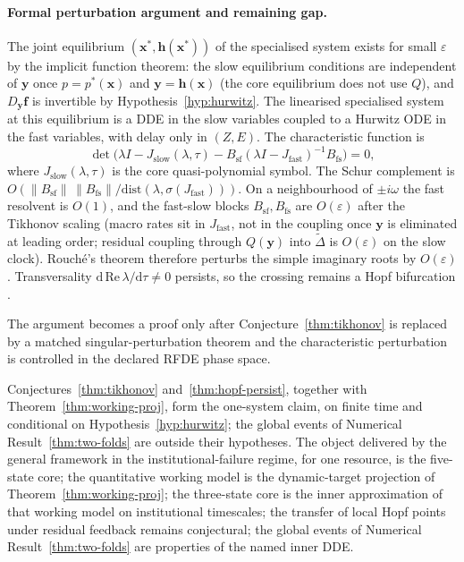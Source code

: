 \documentclass[11pt]{article}
\theoremstyle{definition}
\begin{document}
\paragraph{Formal perturbation argument and remaining gap.}
The joint equilibrium $(\mathbf x^*,\mathbf h(\mathbf x^*))$ of the specialised system exists for small $\varepsilon$ by the implicit function theorem: the slow equilibrium conditions are independent of $\mathbf y$ once $p=p^*(\mathbf x)$ and $\mathbf y=\mathbf h(\mathbf x)$ (the core equilibrium does not use $Q$), and $D_{\mathbf y}\mathbf f$ is invertible by Hypothesis~\ref{hyp:hurwitz}. The linearised specialised system at this equilibrium is a DDE in the slow variables coupled to a Hurwitz ODE in the fast variables, with delay only in $(Z,E)$. The characteristic function is
\[
\det\bigl(\lambda I-J_{\mathrm{slow}}(\lambda,\tau)-B_{\mathrm{sf}}(\lambda I-J_{\mathrm{fast}})^{-1}B_{\mathrm{fs}}\bigr)=0,
\]
where $J_{\mathrm{slow}}(\lambda,\tau)$ is the core quasi-polynomial symbol. The Schur complement is $O(\|B_{\mathrm{sf}}\|\,\|B_{\mathrm{fs}}\|/\mathrm{dist}(\lambda,\sigma(J_{\mathrm{fast}})))$. On a neighbourhood of $\pm i\omega$ the fast resolvent is $O(1)$, and the fast-slow blocks $B_{\mathrm{sf}},B_{\mathrm{fs}}$ are $O(\varepsilon)$ after the Tikhonov scaling (macro rates sit in $J_{\mathrm{fast}}$, not in the coupling once $\mathbf y$ is eliminated at leading order; residual coupling through $Q(\mathbf y)$ into $\widetilde\Delta$ is $O(\varepsilon)$ on the slow clock). Rouch\'e's theorem therefore perturbs the simple imaginary roots by $O(\varepsilon)$. Transversality $\mathrm{d}\,\mathrm{Re}\,\lambda/\mathrm{d}\tau\neq 0$ persists, so the crossing remains a Hopf bifurcation \cite{hale1993,diekmann1995,faria1995}.


The argument becomes a proof only after Conjecture~\ref{thm:tikhonov} is replaced by a matched singular-perturbation theorem and the characteristic perturbation is controlled in the declared RFDE phase space.

Conjectures~\ref{thm:tikhonov} and~\ref{thm:hopf-persist}, together with Theorem~\ref{thm:working-proj}, form the one-system claim, on finite time and conditional on Hypothesis~\ref{hyp:hurwitz}; the global events of Numerical Result~\ref{thm:two-folds} are outside their hypotheses. The object delivered by the general framework in the institutional-failure regime, for one resource, is the five-state core; the quantitative working model is the dynamic-target projection of Theorem~\ref{thm:working-proj}; the three-state core is the inner approximation of that working model on institutional timescales; the transfer of local Hopf points under residual feedback remains conjectural; the global events of Numerical Result~\ref{thm:two-folds} are properties of the named inner DDE.
\end{document}
